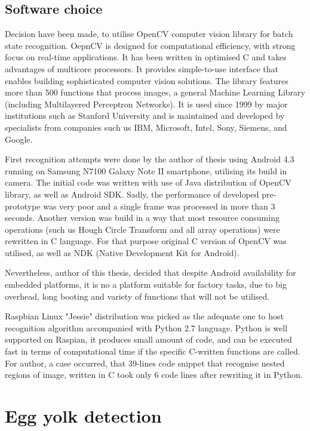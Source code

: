 \documentclass[12pt,twoside,a4paper]{article}
\begin{document}
\subsection{Software choice}
Decision have been made, to utilise OpenCV computer vision library for batch state recognition.
OepnCV is designed for computational efficiency, with strong focus on real-time applications.
It has been written in optimised C and takes advantages of multicore processors.
It provides simple-to-use interface that enables building sophisticated computer vision solutions.
The library features more than 500 functions that process images, a general Machine Learning Library (including Multilayered Perceptron Networks).
It is used since 1999 by major institutions such as Stanford University and is maintained and developed by specialists from companies such us IBM, Microsoft, Intel, Sony, Siemens, and Google.\cite{learnopencv}

First recognition attempts were done by the author of thesis using Android 4.3 running on Samsung N7100 Galaxy Note II smartphone, utilising its build in camera.
The initial code was written with use of Java distribution of OpenCV library, as well as Android SDK.
Sadly, the performance of developed pre-prototype was very poor and a single frame was processed in more than 3 seconds.
Another version was build in a way that most resource consuming operations (such us Hough Circle Transform and all array operations) were rewritten in C language.
For that purpose original C version of OpenCV was utilised, as well as NDK (Native Development Kit for Android).

Nevertheless, author of this thesis, decided that despite Android availability for embedded platforms, it is no a platform suitable for factory tasks, due to big overhead, long booting and variety of functions that will not be utilised.

Raspbian Linux "Jessie" distribution was picked as the adequate one to host recognition algorithm accompanied with Python 2.7 language.
Python is well supported on Raspian, it produces small amount of code, and can be executed fast in terms of computational time if the specific C-written functions are called.\cite{performance}
For author, a case occurred, that 39-lines code snippet that recognise nested regions of image, written in C took only 6 code lines after rewriting it in Python.


\section{Egg yolk detection}
\end{document}
